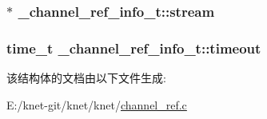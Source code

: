 \subsubsection[{stream}]{$\ast$ \+\_\+channel\+\_\+ref\+\_\+info\+\_\+t\+::stream}\label{a00004_a27701935d3cd7358a0b92b3495afce7f_a27701935d3cd7358a0b92b3495afce7f}
\hypertarget{a00004_a8bc54a1cbfc3bab17586ca3bfae321b4_a8bc54a1cbfc3bab17586ca3bfae321b4}{}
\subsubsection[{timeout}]{\setlength{\rightskip}{0pt plus 5cm}time\+\_\+t \+\_\+channel\+\_\+ref\+\_\+info\+\_\+t\+::timeout}\label{a00004_a8bc54a1cbfc3bab17586ca3bfae321b4_a8bc54a1cbfc3bab17586ca3bfae321b4}


该结构体的文档由以下文件生成\+:\begin{DoxyCompactItemize}
\item 
E\+:/knet-\/git/knet/knet/\hyperlink{a00044}{channel\+\_\+ref.\+c}\end{DoxyCompactItemize}
